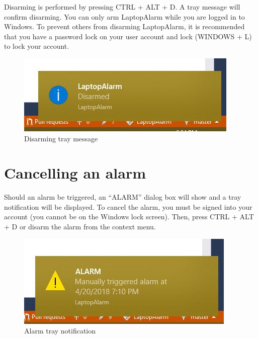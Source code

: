 \documentclass[12pt, letterpaper]{article}
\begin{document}
Disarming is performed by pressing CTRL + ALT + D. A tray message will confirm disarming. You can only arm LaptopAlarm while you are logged in to Windows. To prevent others from disarming LaptopAlarm, it is recommended that you have a password lock on your user account and lock (WINDOWS + L) to lock your account.

\begin{figure}[H]
  \caption{Disarming tray message}
  \centering
    \includegraphics{figures/figure02.JPG}
\end{figure}

\section{Cancelling an alarm}

Should an alarm be triggered, an ``ALARM'' dialog box will show and a tray notification will be displayed. To cancel the alarm, you must be signed into your account (you cannot be on the Windows lock screen). Then, press CTRL + ALT + D or disarm the alarm from the context menu.

\begin{figure}[H]
  \caption{Alarm tray notification}
  \centering
    \includegraphics{figures/figure04.JPG}
\end{figure}
\end{document}
